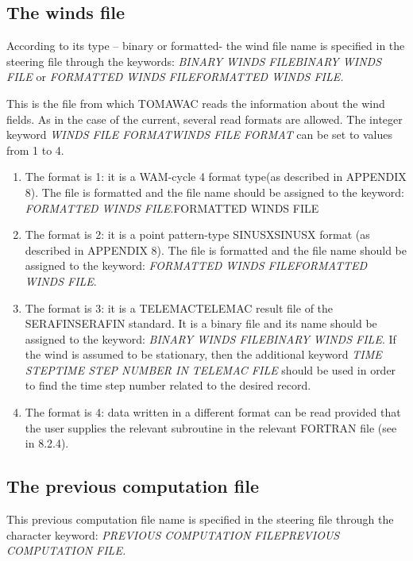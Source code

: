 \subsection{ The winds file}

 According to its type -- binary or formatted- the wind file name is specified in the steering file through the keywords: \textit{BINARY WINDS FILEBINARY WINDS FILE }or\textit{ FORMATTED WINDS FILEFORMATTED WINDS FILE.}

 This is the file from which TOMAWAC reads the information about the wind fields. As in the case of the current, several read formats are allowed. The integer keyword \textit{WINDS FILE FORMATWINDS FILE FORMAT} can\textit{ }be set to values from 1 to 4.

\begin{enumerate}
\item  The format is 1: it is a WAM-cycle 4 format type(as described in APPENDIX 8). The file is formatted and the file name should be assigned to the keyword: \textit{FORMATTED WINDS FILE}.FORMATTED WINDS FILE

\item  The format is 2: it is a point pattern-type SINUSXSINUSX format (as described in APPENDIX 8). The file is formatted and the file name should be assigned to the keyword: \textit{FORMATTED WINDS FILEFORMATTED WINDS FILE}.

\item  The format is 3: it is a TELEMACTELEMAC result file of the SERAFINSERAFIN standard. It is a binary file and its name should be assigned to the keyword: \textit{BINARY WINDS FILEBINARY WINDS FILE}. If the wind is assumed to be stationary, then the additional keyword \textit{TIME STEPTIME STEP NUMBER IN TELEMAC FILE }should be used in order to find the time step number related to the desired record.

\item  The format is 4: data written in a different format can be read provided that the user supplies the relevant subroutine in the relevant FORTRAN file (see in 8.2.4).
\end{enumerate}


\subsection{ The previous computation file}

 This previous computation file name is specified in the steering file through the character keyword: \textit{PREVIOUS COMPUTATION FILEPREVIOUS COMPUTATION FILE.}


